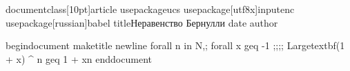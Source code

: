 documentclass[10pt]{article}  
usepackage{ucs} 
usepackage[utf8x]{inputenc} 
usepackage[russian]{babel}  
title{Неравенство Бернулли}  
date{}  
author{}

begin{document}  
maketitle{}  
newline
forall n in N,; forall x geq -1  ;;;;
Large{textbf{(1 + x) ^ n geq 1 + xn} } 
  end{document}
